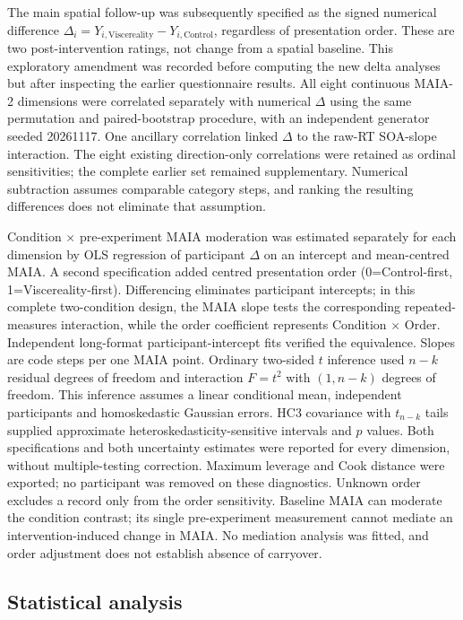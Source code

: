The main spatial follow-up was subsequently specified as the signed numerical difference $\Delta_i=Y_{i,\mathrm{Viscereality}}-Y_{i,\mathrm{Control}}$, regardless of presentation order. These are two post-intervention ratings, not change from a spatial baseline. This exploratory amendment was recorded before computing the new delta analyses but after inspecting the earlier questionnaire results. All eight continuous MAIA-2 dimensions were correlated separately with numerical $\Delta$ using the same permutation and paired-bootstrap procedure, with an independent generator seeded 20261117. One ancillary correlation linked $\Delta$ to the raw-RT SOA-slope interaction. The eight existing direction-only correlations were retained as ordinal sensitivities; the complete earlier set remained supplementary. Numerical subtraction assumes comparable category steps, and ranking the resulting differences does not eliminate that assumption.

Condition $\times$ pre-experiment MAIA moderation was estimated separately for each dimension by OLS regression of participant $\Delta$ on an intercept and mean-centred MAIA. A second specification added centred presentation order (0=Control-first, 1=Viscereality-first). Differencing eliminates participant intercepts; in this complete two-condition design, the MAIA slope tests the corresponding repeated-measures interaction, while the order coefficient represents Condition $\times$ Order. Independent long-format participant-intercept fits verified the equivalence. Slopes are code steps per one MAIA point. Ordinary two-sided $t$ inference used $n-k$ residual degrees of freedom and interaction $F=t^2$ with $(1,n-k)$ degrees of freedom. This inference assumes a linear conditional mean, independent participants and homoskedastic Gaussian errors. HC3 covariance with $t_{n-k}$ tails supplied approximate heteroskedasticity-sensitive intervals and $p$ values. Both specifications and both uncertainty estimates were reported for every dimension, without multiple-testing correction. Maximum leverage and Cook distance were exported; no participant was removed on these diagnostics. Unknown order excludes a record only from the order sensitivity. Baseline MAIA can moderate the condition contrast; its single pre-experiment measurement cannot mediate an intervention-induced change in MAIA. No mediation analysis was fitted, and order adjustment does not establish absence of carryover.

\subsection{Statistical analysis}
\label{study5:sec:stats}

